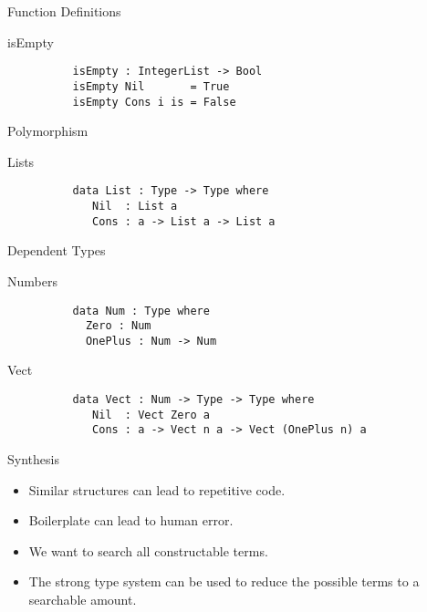 \documentclass[presentation]{beamer}
\begin{document}
\begin{frame}[fragile]{Function Definitions}
      \begin{block}{isEmpty}
        \begin{verbatim}
          isEmpty : IntegerList -> Bool
          isEmpty Nil       = True
          isEmpty Cons i is = False
        \end{verbatim}
      \end{block}
\end{frame}

\begin{frame}[fragile]{Polymorphism}
      \begin{block}{Lists}
        \begin{verbatim}
          data List : Type -> Type where
             Nil  : List a
             Cons : a -> List a -> List a
        \end{verbatim}
      \end{block}
\end{frame}

\begin{frame}[fragile]{Dependent Types}
      \begin{block}{Numbers}
        \begin{verbatim}
          data Num : Type where
            Zero : Num
            OnePlus : Num -> Num 
        \end{verbatim}
      \end{block}
      \begin{block}{Vect}
        \begin{verbatim}
          data Vect : Num -> Type -> Type where
             Nil  : Vect Zero a
             Cons : a -> Vect n a -> Vect (OnePlus n) a
        \end{verbatim}
      \end{block}
\end{frame}

\begin{frame}[fragile]{Synthesis}
  \begin{itemize}
  \item Similar structures can lead to repetitive code.
  \item Boilerplate can lead to human error.
  \item We want to search all constructable terms. 
  \item The strong type system can be used to reduce
    the possible terms to a searchable amount. 
  \end{itemize}
\end{frame}
\end{document}
